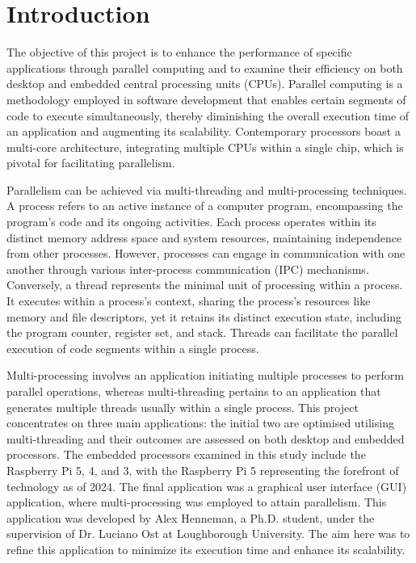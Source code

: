 \documentclass[12pt, openany]{book}
\begin{document}
\newpage
\tableofcontents

\chapter{Introduction}
The objective of this project is to enhance the performance of specific applications through parallel computing and to examine their efficiency on both desktop and embedded central processing units (CPUs). Parallel computing is a methodology employed in software development that enables certain segments of code to execute simultaneously, thereby diminishing the overall execution time of an application and augmenting its scalability. Contemporary processors boast a multi-core architecture, integrating multiple CPUs within a single chip, which is pivotal for facilitating parallelism\cite{modern_processors}.  

Parallelism can be achieved via multi-threading and multi-processing techniques. A process refers to an active instance of a computer program, encompassing the program's code and its ongoing activities. Each process operates within its distinct memory address space and system resources, maintaining independence from other processes. However, processes can engage in communication with one another through various inter-process communication (IPC) mechanisms. Conversely, a thread represents the minimal unit of processing within a process. It executes within a process's context, sharing the process’s resources like memory and file descriptors, yet it retains its distinct execution state, including the program counter, register set, and stack. Threads can facilitate the parallel execution of code segments within a single process\cite{multi_processing_multi_threading_article}.

Multi-processing involves an application initiating multiple processes to perform parallel operations, whereas multi-threading pertains to an application that generates multiple threads usually within a single process. This project concentrates on three main applications: the initial two are optimised utilising multi-threading and their outcomes are assessed on both desktop and embedded processors. The embedded processors examined in this study include the Raspberry Pi 5, 4, and 3, with the Raspberry Pi 5 representing the forefront of technology as of 2024. The final application was a graphical user interface (GUI) application, where multi-processing was employed to attain parallelism. This application was developed by Alex Henneman, a Ph.D. student, under the supervision of Dr. Luciano Ost\cite{debate_fi_publication} at Loughborough University. The aim here was to refine this application to minimize its execution time and enhance its scalability. 
\end{document}
